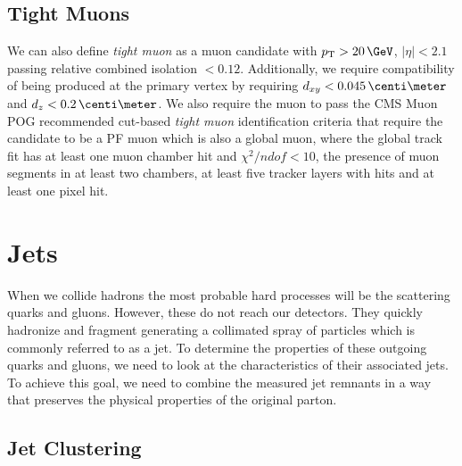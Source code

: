 \subsection{Tight Muons}


We can also define \textit{tight muon} as a muon candidate with $\pt>20\,\GeV$, $|\eta|<2.1$ passing relative combined isolation $<0.12$. Additionally, we require compatibility of being produced at the primary vertex by requiring $d_{xy}<0.045\,\centi\meter$ and $d_z < 0.2\,\centi\meter$. We also require the muon to pass the  \gls{CMS} Muon \gls{POG} recommended cut-based \textit{tight muon} identification criteria that require the candidate to be a \gls{PF} muon which is also a global muon, where the global track fit has at least one muon chamber hit and $\chi^2/ndof < 10$, the presence of muon segments in at least two chambers, at least five tracker layers with hits and at least one pixel hit.

\section{Jets}
\label{SECTION:EventReconstructionAndSimulation_Jets}


When we collide hadrons the most probable hard processes will be the scattering quarks and gluons. However, these do not reach our detectors. They quickly hadronize and fragment generating a collimated spray of particles which is commonly referred to as a jet. To determine the properties of these outgoing quarks and gluons, we need to look at the characteristics of their associated jets. To achieve this goal, we need to combine the measured jet remnants in a way that preserves the physical properties of the original parton.

\subsection{Jet Clustering}
\label{SECTION:EventReconstructionAndSimulation_Jets_JetClustering}

